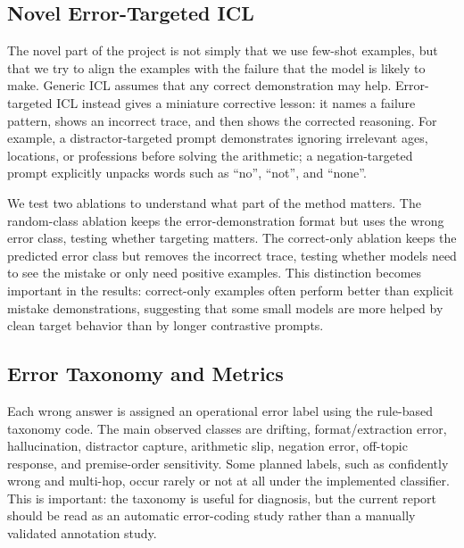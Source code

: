\documentclass[10pt,twocolumn]{article}
\begin{document}
\subsection{Novel Error-Targeted ICL}
The novel part of the project is not simply that we use few-shot examples, but that we try to align the examples with the failure that the model is likely to make. Generic ICL assumes that any correct demonstration may help. Error-targeted ICL instead gives a miniature corrective lesson: it names a failure pattern, shows an incorrect trace, and then shows the corrected reasoning. For example, a distractor-targeted prompt demonstrates ignoring irrelevant ages, locations, or professions before solving the arithmetic; a negation-targeted prompt explicitly unpacks words such as ``no'', ``not'', and ``none''.

We test two ablations to understand what part of the method matters. The random-class ablation keeps the error-demonstration format but uses the wrong error class, testing whether targeting matters. The correct-only ablation keeps the predicted error class but removes the incorrect trace, testing whether models need to see the mistake or only need positive examples. This distinction becomes important in the results: correct-only examples often perform better than explicit mistake demonstrations, suggesting that some small models are more helped by clean target behavior than by longer contrastive prompts.

\subsection{Error Taxonomy and Metrics}
Each wrong answer is assigned an operational error label using the rule-based taxonomy code. The main observed classes are drifting, format/extraction error, hallucination, distractor capture, arithmetic slip, negation error, off-topic response, and premise-order sensitivity. Some planned labels, such as confidently wrong and multi-hop, occur rarely or not at all under the implemented classifier. This is important: the taxonomy is useful for diagnosis, but the current report should be read as an automatic error-coding study rather than a manually validated annotation study.
\end{document}
